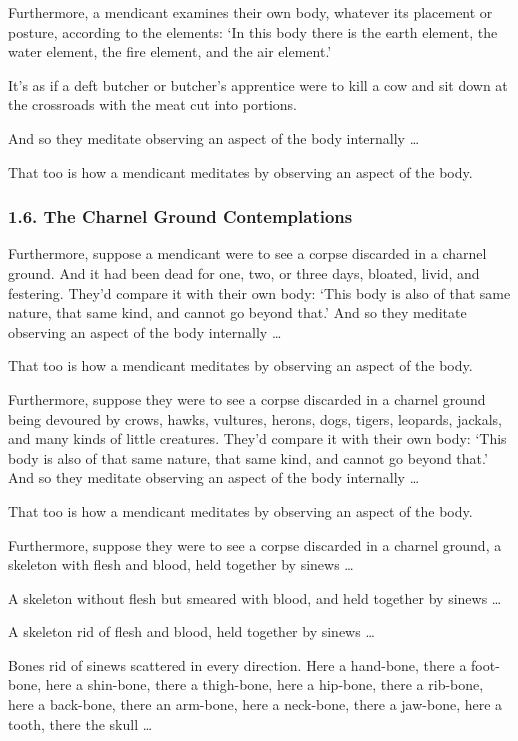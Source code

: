 \documentclass[12pt,openany]{book}%
\begin{document}
Furthermore, a mendicant examines their own body, whatever its placement or posture, according to the elements: ‘In this body there is the earth element, the water element, the fire element, and the air element.’ 

It’s as if a deft butcher or butcher’s apprentice were to kill a cow and sit down at the crossroads with the meat cut into portions. 

And so they meditate observing an aspect of the body internally … 

That too is how a mendicant meditates by observing an aspect of the body. 

\subsubsection*{1.6. The Charnel Ground Contemplations }

Furthermore, suppose a mendicant were to see a corpse discarded in a charnel ground. And it had been dead for one, two, or three days, bloated, livid, and festering. They’d compare it with their own body: ‘This body is also of that same nature, that same kind, and cannot go beyond that.’ And so they meditate observing an aspect of the body internally … 

That too is how a mendicant meditates by observing an aspect of the body. 

Furthermore, suppose they were to see a corpse discarded in a charnel ground being devoured by crows, hawks, vultures, herons, dogs, tigers, leopards, jackals, and many kinds of little creatures. They’d compare it with their own body: ‘This body is also of that same nature, that same kind, and cannot go beyond that.’ And so they meditate observing an aspect of the body internally … 

That too is how a mendicant meditates by observing an aspect of the body. 

Furthermore, suppose they were to see a corpse discarded in a charnel ground, a skeleton with flesh and blood, held together by sinews … 

A skeleton without flesh but smeared with blood, and held together by sinews … 

A skeleton rid of flesh and blood, held together by sinews … 

Bones rid of sinews scattered in every direction. Here a hand-bone, there a foot-bone, here a shin-bone, there a thigh-bone, here a hip-bone, there a rib-bone, here a back-bone, there an arm-bone, here a neck-bone, there a jaw-bone, here a tooth, there the skull … 
\end{document}
